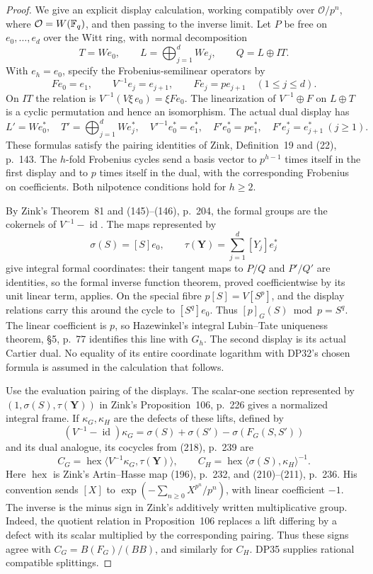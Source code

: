 \documentclass[11pt,a4paper]{article}
\theoremstyle{definition}\newtheorem{remark}[theorem]{Remark}
\newcommand{\id}{\operatorname{id}}\newcommand{\Hom}{\operatorname{Hom}}
\begin{document}
\begin{proof}
We give an explicit display calculation, working compatibly over $\mathcal O/p^n$, where $\mathcal O=W(\mathbb F_q)$, and then passing to the inverse limit. Let $P$ be free on $e_0,\ldots,e_d$ over the Witt ring, with normal decomposition
\[
 T=We_0,\qquad L=\bigoplus_{j=1}^dWe_j,\qquad Q=L\oplus IT.
\]
With $e_h=e_0$, specify the Frobenius-semilinear operators by
\[
 Fe_0=e_1,\qquad V^{-1}e_j=e_{j+1},\qquad Fe_j=pe_{j+1}\quad(1\le j\le d).
\]
On $IT$ the relation is $V^{-1}(V\xi\,e_0)=\xi Fe_0$. The linearization of $V^{-1}\oplus F$ on $L\oplus T$ is a cyclic permutation and hence an isomorphism. The actual dual display has
\[
 L'=We_0^*,\quad T'=\bigoplus_{j=1}^dWe_j^*,\quad
 V'^{-1}e_0^*=e_1^*,\quad F'e_0^*=pe_1^*,\quad
 F'e_j^*=e_{j+1}^*\ (j\ge1).
\]
These formulas satisfy the pairing identities of Zink, Definition~19 and (22), p.~143. The $h$-fold Frobenius cycles send a basis vector to $p^{h-1}$ times itself in the first display and to $p$ times itself in the dual, with the corresponding Frobenius on coefficients. Both nilpotence conditions hold for $h\ge2$.

By Zink's Theorem~81 and (145)--(146), p.~204, the formal groups are the cokernels of $V^{-1}-\id$. The maps represented by
\[
 \sigma(S)=[S]e_0,\qquad \tau(\mathbf Y)=\sum_{j=1}^d[Y_j]e_j^*
\]
give integral formal coordinates: their tangent maps to $P/Q$ and $P'/Q'$ are identities, so the formal inverse function theorem, proved coefficientwise by its unit linear term, applies. On the special fibre $p[S]=V[S^p]$, and the display relations carry this around the cycle to $[S^q]e_0$. Thus $[p]_G(S)\bmod p=S^q$. The linear coefficient is $p$, so Hazewinkel's integral Lubin--Tate uniqueness theorem, \S5, p.~77 identifies this line with $G_h$. The second display is its actual Cartier dual. No equality of its entire coordinate logarithm with DP32's chosen formula is assumed in the calculation that follows.

Use the evaluation pairing of the displays. The scalar-one section represented by $(1,\sigma(S),\tau(\mathbf Y))$ in Zink's Proposition~106, p.~226 gives a normalized integral frame. If $\kappa_G,\kappa_H$ are the defects of these lifts, defined by
\[
 (V^{-1}-\id)\kappa_G=\sigma(S)+\sigma(S')-\sigma(F_G(S,S'))
\]
and its dual analogue, its cocycles from (218), p.~239 are
\begin{equation}\label{eq:display-cocycles}
 C_G=\operatorname{hex}\langle V^{-1}\kappa_G,\tau(\mathbf Y)\rangle,
 \qquad C_H=\operatorname{hex}\langle\sigma(S),\kappa_H\rangle^{-1}.
\end{equation}
Here $\operatorname{hex}$ is Zink's Artin--Hasse map (196), p.~232, and (210)--(211), p.~236. His convention sends $[X]$ to $\exp(-\sum_{n\ge0}X^{p^n}/p^n)$, with linear coefficient $-1$. The inverse is the minus sign in Zink's additively written multiplicative group. Indeed, the quotient relation in Proposition~106 replaces a lift differing by a defect with its scalar multiplied by the corresponding pairing. Thus these signs agree with $C_G=B(F_G)/(BB)$, and similarly for $C_H$. DP35 supplies rational compatible splittings.


\end{proof}
\end{document}
